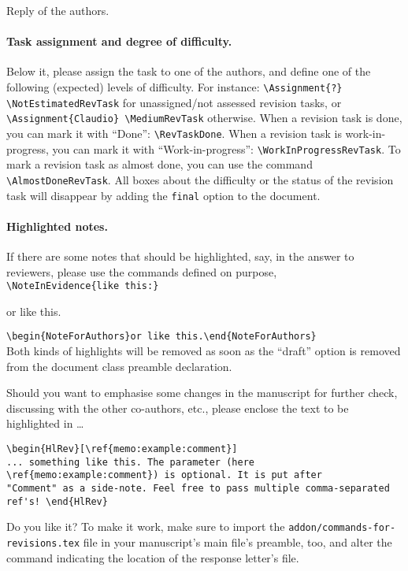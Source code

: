 \begin{Answer}
\begin{sloppypar}
Reply of the authors.
%
%
\paragraph{Task assignment and degree of difficulty.}
Below it, please assign the task to one of the authors, and define one of the following (expected) levels of difficulty.
For instance:
\verb|\Assignment{?} \NotEstimatedRevTask|
for unassigned/not assessed revision tasks, or
\verb|\Assignment{Claudio} \MediumRevTask|
otherwise.
When a revision task is done, you can mark it with ``Done'': \verb|\RevTaskDone|.
When a revision task is work-in-progress, you can mark it with ``Work-in-progress'': \verb|\WorkInProgressRevTask|.
To mark a revision task as almost done, you can use the command \verb|\AlmostDoneRevTask|.
All boxes about the difficulty or the status of the revision task will disappear by adding the \verb|final| option to the document.
%
%
\paragraph{Highlighted notes.}
If there are some notes that should be highlighted, say, in the answer to reviewers, please use the commands defined on purpose,
\\
\verb|\NoteInEvidence{like this:}|
\\
\begin{NoteForAuthors}or like this.\end{NoteForAuthors}
\verb|\begin{NoteForAuthors}or like this.\end{NoteForAuthors}|
\\
Both kinds of highlights will be removed as soon as the ``draft'' option is removed from the document class preamble declaration.
\\
\begin{HlRev}[\ref{memo:example:comment}]
Should you want to emphasise some changes in the manuscript for further check, discussing with the other co-authors, etc., please enclose the text to be highlighted in \ldots
\end{HlRev}
\begin{verbatim}
\begin{HlRev}[\ref{memo:example:comment}]
... something like this. The parameter (here \ref{memo:example:comment}) is optional. It is put after
"Comment" as a side-note. Feel free to pass multiple comma-separated ref's! \end{HlRev}
\end{verbatim}
%
Do you like it? To make it work, make sure to import the \verb|addon/commands-for-revisions.tex| file in your manuscript's main file's preamble, too, and alter the \verb|| command indicating the location of the response letter's file. 
%

\end{sloppypar}
\end{Answer}
